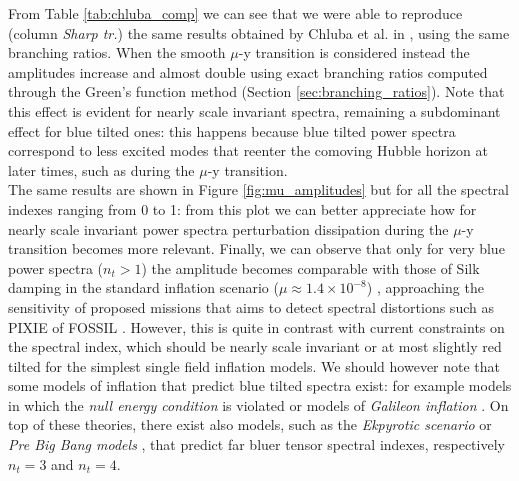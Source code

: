 From Table \ref{tab:chluba_comp} we can see that we were able to reproduce (column \emph{Sharp tr.}) the same results obtained by Chluba et al. in \cite{Chluba_tens_diss}, using the same branching ratios. When the smooth $\mu$-y transition is considered instead the amplitudes increase and almost double using exact branching ratios computed through the Green's function method (Section \ref{sec:branching_ratios}). Note that this effect is evident for nearly scale invariant spectra, remaining a subdominant effect for blue tilted ones: this happens because blue tilted power spectra correspond to less excited modes that reenter the comoving Hubble horizon at later times, such as during the $\mu$-y transition.\\ The same results are shown in Figure \ref{fig:mu_amplitudes} but for all the spectral indexes ranging from 0 to 1: from this plot we can better appreciate how for nearly scale invariant power spectra perturbation dissipation during the $\mu$-y transition becomes more relevant. Finally, we can observe that only for very blue power spectra ($n_t>1$) the amplitude becomes comparable with those of Silk damping in the standard inflation scenario ($\mu\approx1.4\times10^{-8}$) \cite{Chluba_2x2}, approaching the sensitivity of proposed missions that aims to detect spectral distortions such as PIXIE \cite{pixie} of FOSSIL \cite{IAS_Fossil}. However, this is quite in contrast with current constraints on the spectral index, which should be nearly scale invariant or at most slightly red tilted for the simplest single field inflation models. We should however note that some models of inflation that predict blue tilted spectra exist: for example models in which the \textit{null energy condition} is violated \cite{Baldi_2005} or models of \textit{Galileon inflation} \cite{Kobayashi_2010}. On top of these theories, there exist also models, such as the \textit{Ekpyrotic scenario} \cite{Khoury_2001} or \textit{Pre Big Bang models} \cite{Gasperini_2003}, that predict  far bluer tensor spectral indexes, respectively $n_t=3$ and $n_t=4$. 

